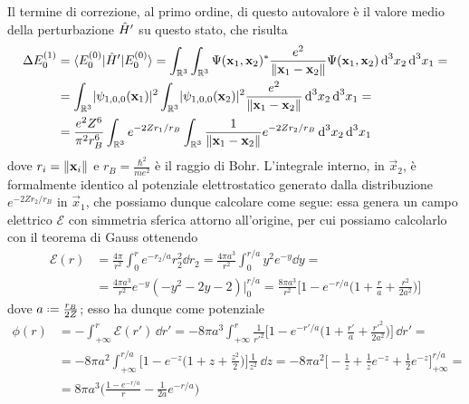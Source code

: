 Il termine di correzione, al primo ordine, di questo autovalore è il valore medio della perturbazione $\hat{H}'$ su questo stato, che risulta
\begin{equation}
    \begin{split}
        \Delta E_0^{(1)}&=
        \langle E_0^{(0)}\rvert\hat{H}'\lvert E_0^{(0)}\rangle=
        \int_{\mathbb{R}^3}\int_{\mathbb{R}^3}\Psi(\mathbf{x}_1,\mathbf{x}_2)^*\frac{e^2}{\lVert\mathbf{x}_1-\mathbf{x}_2\rVert}\Psi(\mathbf{x}_1,\mathbf{x}_2)\,\textup{d}^3 x_2\,\textup{d}^3 x_1=\\&=
        \int_{\mathbb{R}^3}\lvert\psi_{1,0,0}(\mathbf{x}_1)\rvert^2\int_{\mathbb{R}^3}\lvert\psi_{1,0,0}(\mathbf{x}_2)\rvert^2\frac{e^2}{\lVert\mathbf{x}_1-\mathbf{x}_2\rVert}\,\textup{d}^3 x_2\,\textup{d}^3 x_1=\\&=
        \frac{e^2Z^6}{\pi^2 r_B^6}\int_{\mathbb{R}^3}e^{-2Zr_1/r_B}\int_{\mathbb{R}^3}\frac1{\lVert\mathbf{x}_1-\mathbf{x}_2\rVert}e^{-2Zr_2/r_B}\,\textup{d}^3 x_2\,\textup{d}^3 x_1
    \end{split}
    \label{eq:perturbazione-stato-fondamentale-elio-1}
\end{equation}
dove $r_i=\lVert\mathbf{x}_i\rVert$ e $r_B=\frac{\hbar^2}{me^2}$ è il raggio di Bohr.
L'integrale interno, in $\vec x_2$, è formalmente identico al potenziale elettrostatico generato dalla distribuzione $e^{-2Zr_2/r_B}$ in $\vec x_1$, che possiamo dunque calcolare come segue: essa genera un campo elettrico $\mathcal E$ con simmetria sferica attorno all'origine, per cui possiamo calcolarlo con il teorema di Gauss ottenendo
\begin{equation}
    \begin{split}
        \mathcal E(r)&=
        \frac{4\pi}{r^2}\int_0^re^{-r_2/a}r_2^2\dd r_2=
        \frac{4\pi a^3}{r^2}\int_0^{r/a}y^2e^{-y}\dd y=\\&=
        \frac{4\pi a^3}{r^2}e^{-y}(-y^2-2y-2)\Bigr|_0^{r/a}=
        \frac{8\pi a^3}{r^2}\biggl[1-e^{-r/a}\biggl(1+\frac{r}{a}+\frac{r^2}{2a^2}\biggr)\biggr]
    \end{split}
\end{equation}
dove $a\defeq\frac{r_B}{2Z}$; esso ha dunque come potenziale
\begin{equation}
    \begin{split}
        \phi(r)&=
        -\int_{+\infty}^r\mathcal E(r')\,\dd r'=
        -8\pi a^3\int_{+\infty}^r\frac1{r'^2}\biggl[1-e^{-r'/a}\biggl(1+\frac{r'}{a}+\frac{r'^2}{2a^2}\biggr)\biggr]\,\dd r'=\\&=
        -8\pi a^2\int_{+\infty}^{r/a}\biggl[1-e^{-z}\biggl(1+z+\frac{z^2}2\biggr)\biggr]\frac1{z^2}\,\dd z=
        -8\pi a^2\biggl[-\frac1{z}+\frac1{z}e^{-z}+\frac12e^{-z}\biggr]_{+\infty}^{r/a}=\\&=
        8\pi a^3\biggl(\frac{1-e^{-r/a}}{r}-\frac1{2a}e^{-r/a}\biggr)
    \end{split}
\end{equation}
